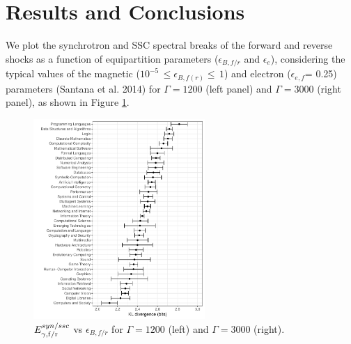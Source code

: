 \documentclass[11pt,twoside]{article}
\begin{document}
\section{Results and Conclusions}
%
\noindent We plot the synchrotron and SSC spectral breaks of the forward and reverse shocks as a function of equipartition parameters ($\epsilon_{B,f/r}$ and $\epsilon_{e}$), considering the typical values of the magnetic  ($10^{-5}\,\leq\epsilon_{B,f(r)}\leq\,1$) and electron ($\epsilon_{e,f}$= 0.25) parameters (Santana et al. 2014) for $\Gamma=1200$ (left panel) and $\Gamma=3000$ (right panel), as shown in Figure \ref{fig1}.
%
%
\begin{figure} %
\includegraphics[height=7.6cm]{fig1.pdf}
\caption{$E^{syn/ssc}_{\rm \gamma,f/r}$ vs  $\epsilon_{B,f/r}$ for $\Gamma=1200$ (left) and $\Gamma=3000$ (right).}
\label{fig1}
\end{figure}
\end{document}
